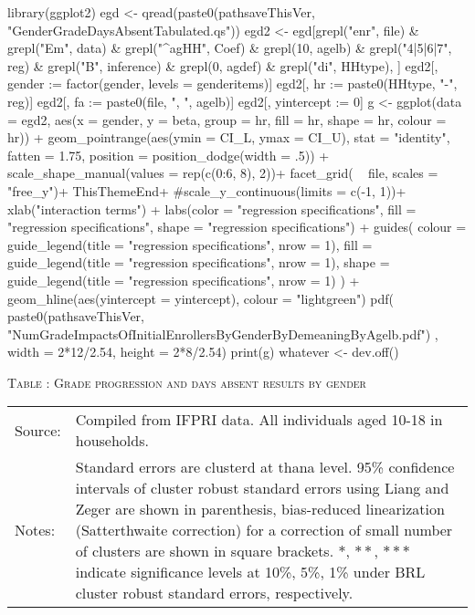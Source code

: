 \begin{Schunk}
\begin{Sinput}
library(ggplot2)
egd <- qread(paste0(pathsaveThisVer, "GenderGradeDaysAbsentTabulated.qs"))
egd2 <- egd[grepl("enr", file) & grepl("Em", data) & grepl("^agHH", Coef) & grepl(10, agelb) &
  grepl("4|5|6|7", reg) & grepl("B", inference) & grepl(0, agdef) & grepl("di", HHtype), ]
egd2[, gender := factor(gender, levels = genderitems)]
egd2[, hr := paste0(HHtype, "-", reg)]
egd2[, fa := paste0(file, ", ", agelb)]
egd2[, yintercept := 0]
g <- 
ggplot(data = egd2, 
    aes(x = gender, y = beta, group = hr, fill = hr, shape = hr, colour = hr)) + 
  geom_pointrange(aes(ymin = CI_L, ymax = CI_U),
    stat = "identity", fatten = 1.75, 
    position = position_dodge(width = .5)) +
  scale_shape_manual(values = rep(c(0:6, 8), 2))+
  facet_grid( ~ file, scales = "free_y")+
  ThisThemeEnd+
  #scale_y_continuous(limits = c(-1, 1))+
  xlab("interaction terms") + 
  labs(color  = "regression specifications", fill = "regression specifications", 
    shape = "regression specifications") +
  guides(
    colour = guide_legend(title = "regression specifications", nrow = 1),
    fill = guide_legend(title = "regression specifications", nrow = 1),
    shape = guide_legend(title = "regression specifications", nrow = 1)
    ) +
  geom_hline(aes(yintercept = yintercept), colour = "lightgreen")
pdf(
  paste0(pathsaveThisVer, "NumGradeImpactsOfInitialEnrollersByGenderByDemeaningByAgelb.pdf")
  , width = 2*12/2.54, height = 2*8/2.54)
print(g)
whatever <- dev.off()
\end{Sinput}
\end{Schunk}





\begin{table}
\hfil\textsc{\footnotesize Table \thetable: Grade progression and days absent results by gender\label{NumGradesDaysAbsentGenderResultsTable}}\\
\setlength{\tabcolsep}{1pt}
\renewcommand{\arraystretch}{.525}
\hspace{-1.5cm}

\renewcommand{\arraystretch}{1}
\hfil\begin{tabular}{>{\hfill\scriptsize}p{1cm}<{}>{\scriptsize}p{12cm}<{\hfill}}
Source:& Compiled from IFPRI data. All individuals aged 10-18 in households. \\[-1ex]
Notes:& Standard errors are clusterd at thana level. 95\% confidence intervals of cluster robust standard errors using Liang and Zeger are shown in parenthesis, bias-reduced linearization (Satterthwaite correction) for a correction of small number of clusters are shown in square brackets. $*$, $**$, $***$ indicate significance levels at 10\%, 5\%, 1\% under BRL cluster robust standard errors, respectively. 
\end{tabular}
\end{table}


